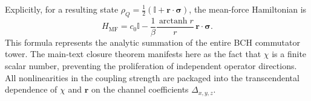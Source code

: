 Explicitly, for a resulting state $\rho_Q = \frac{1}{2}(\mathbb{I} + \mathbf{r}\cdot\boldsymbol{\sigma})$, the mean-force Hamiltonian is
\begin{equation}
    H_{\mathrm{MF}} = c_0\mathbb{I} - \frac{1}{\beta}\frac{\operatorname{arctanh}r}{r}\,\mathbf{r}\cdot\boldsymbol{\sigma}.
    \label{eq:HMF_final_clean}
\end{equation}
This formula represents the analytic summation of the entire BCH commutator tower. The main-text closure theorem manifests here as the fact that $\chi$ is a finite scalar number, preventing the proliferation of independent operator directions. All nonlinearities in the coupling strength are packaged into the transcendental dependence of $\chi$ and $\mathbf{r}$ on the channel coefficients $\Delta_{x,y,z}$.

